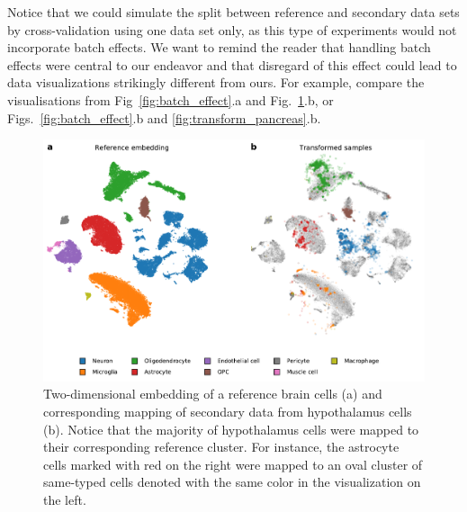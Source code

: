 \documentclass[runningheads]{llncs}
\begin{document}
Notice that we could simulate the split between reference and secondary data
sets by cross-validation using one data set only, as this type of experiments
would not incorporate batch effects. We want to remind the reader that handling
batch effects were central to our endeavor and that disregard of this effect
could lead to data visualizations strikingly different from ours. For example,
compare the visualisations from Fig~\ref{fig:batch_effect}.a and
Fig.~\ref{fig:transform_brain}.b, or Figs.~\ref{fig:batch_effect}.b and
\ref{fig:transform_pancreas}.b.

\begin{figure}[htbp]
\includegraphics[width=\textwidth]{figures/transform_brain.pdf}
\caption{Two-dimensional embedding of a reference brain cells (a) and
corresponding mapping of secondary data from hypothalamus cells (b). Notice
that the majority of hypothalamus cells were mapped to their corresponding
reference cluster. For instance, the astrocyte cells marked with red on the
right were mapped to an oval cluster of same-typed cells denoted with the same
color in the visualization on the left.} \label{fig:transform_brain}
\end{figure}
\end{document}
